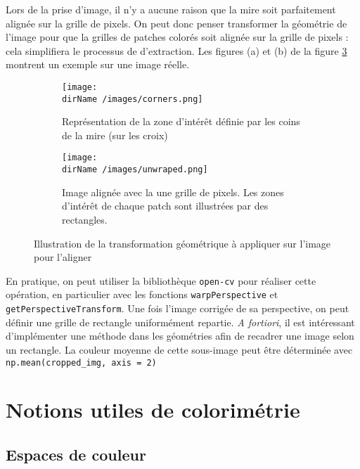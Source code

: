 Lors de la prise d'image, il n'y a aucune raison que la mire soit parfaitement alignée sur la grille de pixels. On peut donc penser transformer la géométrie de l'image pour que la grilles de patches colorés soit alignée sur la grille de pixels : cela simplifiera le processus de d'extraction. Les figures (a) et (b) de la figure \ref{perspective} montrent un exemple sur une image réelle. 

\begin{figure}[h]
	\centering
	\begin{subfigure}[c]{0.4\textwidth}
		\centering
		\texttt{[image: \\dirName /images/corners.png]}
		\caption{Représentation de la zone d'intérêt définie par les coins de la mire (sur les croix)}
		\label{distoredImage}
	\end{subfigure}
	\hfill
	\begin{subfigure}[c]{0.37\textwidth}
		\centering
		\texttt{[image: \\dirName /images/unwraped.png]}
		\caption{Image alignée avec la une grille de pixels. Les zones d'intérêt de chaque patch sont illustrées par des rectangles.}
		\label{undistoredImage}
	\end{subfigure}

\caption{Illustration de la transformation géométrique à appliquer sur l'image pour l'aligner}
\label{perspective}
\end{figure}

En pratique, on peut utiliser la bibliothèque \texttt{open-cv} pour réaliser cette opération, en particulier avec les fonctions \texttt{warpPerspective} et \texttt{getPerspectiveTransform}. 
Une fois l'image corrigée de sa perspective, on peut définir une grille de rectangle uniformément repartie. \textit{A fortiori}, il est intéressant d'implémenter une méthode dans les géométries afin de recadrer une image selon un rectangle. La couleur moyenne de cette sous-image peut être déterminée avec \texttt{np.mean(cropped\_img, axis = 2)}


\section{Notions utiles de colorimétrie}

\subsection{Espaces de couleur}

